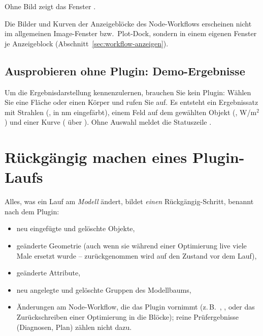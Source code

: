 Ohne Bild zeigt das Fenster .

\begin{hinweis}
Die Bilder und Kurven der Anzeigeblöcke des Node-Workflows erscheinen nicht im allgemeinen
Image-Fenster bzw.\ Plot-Dock, sondern in einem eigenen Fenster je Anzeigeblock
(Abschnitt~\ref{sec:workflow-anzeigen}).
\end{hinweis}

\subsection{Ausprobieren ohne Plugin: Demo-Ergebnisse}

Um die Ergebnisdarstellung kennenzulernen, brauchen Sie kein Plugin: Wählen Sie eine Fläche
oder einen Körper und rufen Sie  auf. Es
entsteht ein Ergebnissatz  mit Strahlen (, in nm eingefärbt), einem
Feld auf dem gewählten Objekt (, W/m$^2$) und einer Kurve ( über
). Ohne Auswahl meldet die Statuszeile .

\section{Rückgängig machen eines Plugin-Laufs}\label{sec:plugin-undo}

Alles, was ein Lauf am \emph{Modell} ändert, bildet \emph{einen} Rückgängig-Schritt, benannt
nach dem Plugin:

\begin{itemize}
  \item neu eingefügte und gelöschte Objekte,
  \item geänderte Geometrie (auch wenn sie während einer Optimierung live viele Male ersetzt
        wurde – zurückgenommen wird auf den Zustand vor dem Lauf),
  \item geänderte Attribute,
  \item neu angelegte und gelöschte Gruppen des Modellbaums,
  \item Änderungen am Node-Workflow, die das Plugin vornimmt (z.\,B.\ ,
        ,  oder das Zurückschreiben einer
        Optimierung in die Blöcke); reine Prüfergebnisse (Diagnosen, Plan) zählen nicht dazu.
\end{itemize}

